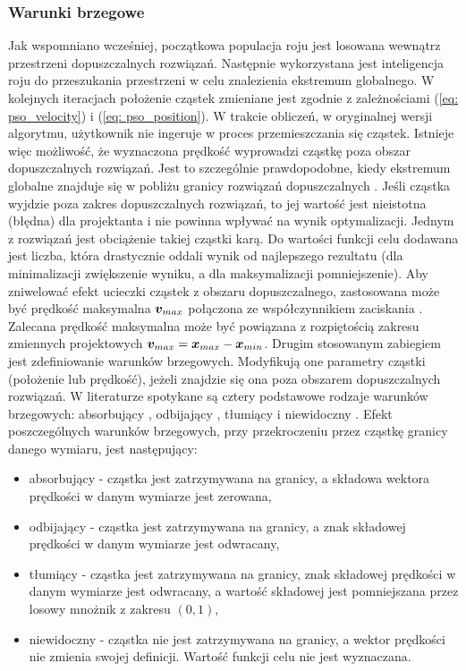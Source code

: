 %
\subsubsection{Warunki brzegowe}
Jak wspomniano wcześniej, początkowa populacja roju jest losowana wewnątrz przestrzeni dopuszczalnych rozwiązań. Następnie wykorzystana jest inteligencja roju do przeszukania przestrzeni w celu znalezienia ekstremum globalnego. W kolejnych iteracjach położenie cząstek zmieniane jest zgodnie z zależnościami (\ref{eq: pso_velocity}) i (\ref{eq: pso_position}). W trakcie obliczeń, w oryginalnej wersji algorytmu, użytkownik nie ingeruje w proces przemieszczania się cząstek. Istnieje więc możliwość, że wyznaczona prędkość wyprowadzi cząstkę poza obszar dopuszczalnych rozwiązań. Jest to szczególnie prawdopodobne, kiedy ekstremum globalne znajduje się w pobliżu granicy rozwiązań dopuszczalnych \parencite{Xu2007}. Jeśli cząstka wyjdzie poza zakres dopuszczalnych rozwiązań, to jej wartość jest nieistotna (błędna) dla projektanta i nie powinna wpływać na wynik optymalizacji. Jednym z rozwiązań jest obciążenie takiej cząstki karą. Do wartości funkcji celu dodawana jest liczba, która drastycznie oddali wynik od najlepszego rezultatu (dla minimalizacji zwiększenie wyniku, a dla maksymalizacji pomniejszenie). 
Aby zniwelować efekt ucieczki cząstek z obszaru dopuszczalnego, zastosowana może być prędkość maksymalna $\bm{v}_{max}$ połączona ze współczynnikiem zaciskania \parencite{Eberhart2001a}. Zalecana prędkość maksymalna może być powiązana z rozpiętością zakresu zmiennych projektowych $\bm{v}_{max}=\bm{x}_{max}-\bm{x}_{min}$. Drugim stosowanym zabiegiem jest zdefiniowanie warunków brzegowych. Modyfikują one parametry cząstki (położenie lub prędkość), jeżeli znajdzie się ona poza obszarem dopuszczalnych rozwiązań. W literaturze spotykane są cztery podstawowe rodzaje warunków brzegowych: absorbujący , odbijający , tłumiący  i niewidoczny  \parencite{Robinson2004,Huang2005}. Efekt poszczególnych warunków brzegowych, przy przekroczeniu przez cząstkę granicy danego wymiaru, jest następujący:
\begin{itemize}
	\item absorbujący - cząstka jest zatrzymywana na granicy, a składowa wektora prędkości w danym wymiarze jest zerowana,
	\item odbijający -  cząstka jest zatrzymywana na granicy, a znak składowej prędkości w danym wymiarze jest odwracany,
	\item tłumiący - cząstka jest zatrzymywana na granicy, znak składowej prędkości w danym wymiarze jest odwracany, a wartość składowej jest pomniejszana przez losowy mnożnik z zakresu $(0,1)$,
	\item niewidoczny - cząstka nie jest zatrzymywana na granicy, a wektor prędkości nie zmienia swojej definicji. Wartość funkcji celu nie jest wyznaczana.
\end{itemize} 

